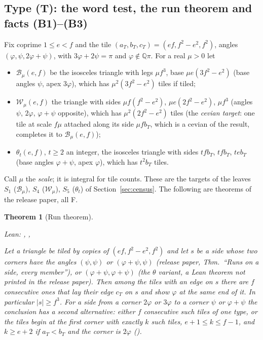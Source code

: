 \documentclass[11pt,reqno]{amsart}
\theoremstyle{plain}
\newtheorem{theorem}{Theorem}[section]
\theoremstyle{definition}
\newcommand{\Q}{\mathbb{Q}}
\newcommand{\sF}{\textup{\textsf{F}}}
\begin{document}
\subsection{Type (T): the word test, the run theorem and facts (B1)--(B3)}\label{sub:typeT}
Fix coprime $1\le e<f$ and the tile $(a_T,b_T,c_T)=(ef,f^2-e^2,f^2)$, angles $(\varphi,\psi,2\varphi+\psi)$, with $3\varphi+2\psi=\pi$ and $\varphi\notin\Q\pi$. For a real $\mu>0$ let
\begin{itemize}
\item $\mathcal B_\mu(e,f)$ be the isosceles triangle with legs $\mu f^3$, base $\mu e(3f^2-e^2)$ (base angles $\psi$, apex $3\varphi$), which has $\mu^2(3f^2-e^2)$ tiles if tiled;
\item $\mathcal W_\mu(e,f)$ the triangle with sides $\mu f(f^2-e^2)$, $\mu e(2f^2-e^2)$, $\mu f^3$ (angles $\psi$, $2\varphi$, $\varphi+\psi$ opposite), which has $\mu^2(2f^2-e^2)$ tiles (the \emph{cevian target}: one tile at scale $f\mu$ attached along its side $\mu f b_T$, which is a cevian of the result, completes it to $\mathcal B_\mu(e,f)$);
\item $\theta_t(e,f)$, $t\ge2$ an integer, the isosceles triangle with sides $tfb_T$, $tfb_T$, $teb_T$ (base angles $\varphi+\psi$, apex $\varphi$), which has $t^2b_T$ tiles.
\end{itemize}
Call $\mu$ the \emph{scale}; it is integral for tile counts. These are the targets of the leaves $S_1$ ($\mathcal B_\mu$), $S_4$ ($\mathcal W_\mu$), $S_5$ ($\theta_t$) of Section~\ref{sec:census}. The following are theorems of the release paper, all \sF.
\begin{theorem}[Run theorem]\label{thm:run}
{\small\noindent\emph{Lean:} , , \par}
Let a triangle be tiled by copies of $(ef,f^2-e^2,f^2)$ and let $s$ be a side whose two corners have the angles $(\psi,\psi)$ or $(\varphi+\psi,\psi)$ (release paper, Thm.\ ``Runs on a side, every member''), or $(\varphi+\psi,\varphi+\psi)$ (the $\theta$ variant, a Lean theorem not printed in the release paper). Then among the tiles with an edge on $s$ there are $f$ consecutive ones that lay their edge $c_T$ on $s$ and show $\varphi$ at the same end of it. In particular $|s|\ge f^3$. For a side from a corner $2\varphi$ or $3\varphi$ to a corner $\psi$ or $\varphi+\psi$ the conclusion has a second alternative: either $f$ consecutive such tiles of one type, or the tiles begin at the first corner with exactly $k$ such tiles, $e+1\le k\le f-1$, and $k\ge e+2$ if $a_T<b_T$ and the corner is $2\varphi$ ().
\end{theorem}
\end{document}
